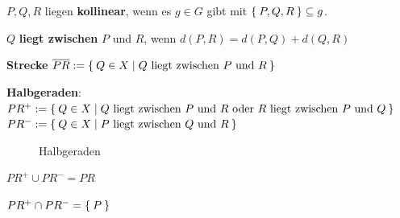 \begin{definition}
    \begin{defenum}
        \item $P, Q, R$ liegen \textbf{kollinear}, 
              wenn es $g \in G$ gibt mit $\Set{P, Q, R} \subseteq g$.
        \item $Q$ \textbf{liegt zwischen} $P$
              und $R$, wenn $d(P, R) = d(P, Q) + d(Q, R)$
        \item \textbf{Strecke} $\overline{PR} := \Set{Q \in X | Q \text{ liegt zwischen } P \text{ und } R}$
        \item \textbf{Halbgeraden}:\\
              $PR^+ := \Set{Q \in X | Q \text{ liegt zwischen } P \text{ und } R \text{ oder } R \text{ liegt zwischen } P \text{ und } Q}$\\
              $PR^- := \Set{Q \in X | P \text{ liegt zwischen } Q \text{ und } R}$\\ 
    \end{defenum}
\end{definition}

\begin{figure}[htp]
    \centering
    
    \caption{Halbgeraden}
    \label{fig:halbgeraden}
\end{figure}

\begin{bemerkung}
    \begin{bemenum}
        \item $PR^+ \cup PR^- = PR$
        \item $PR^+ \cap PR^- = \Set{P}$
    \end{bemenum}
\end{bemerkung}

